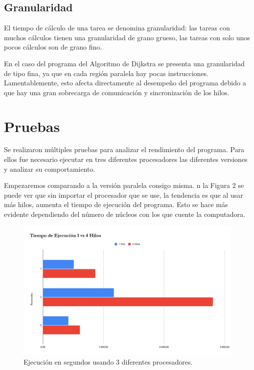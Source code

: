 \documentclass[11pt]{article}
\begin{document}
\subsection{Granularidad}
El tiempo de cálculo de una tarea se denomina granularidad: las tareas con muchos cálculos tienen una granularidad de grano grueso, las tareas con solo unos pocos cálculos son de grano fino. 
\par
En el caso del programa del Algoritmo de Dijkstra se presenta una granularidad de tipo fina, ya que en cada región paralela hay pocas instrucciones. Lamentablemente, esto afecta directamente al desempeño del programa debido a que hay una gran sobrecarga de comunicación y sincronización de los hilos.

\section{Pruebas}

\par
Se realizaron múltiples pruebas para analizar el rendimiento del programa. Para ellos fue necesario ejecutar en tres diferentes procesadores las diferentes versiones y analizar su comportamiento. 

\par
Empezaremos comparando a la versión paralela consigo misma. n la Figura 2 se puede ver que sin importar el procesador que se use, la tendencia es que al usar más hilos, aumenta el tiempo de ejecución del programa. Esto se hace más evidente dependiendo del número de núcleos con los que cuente la computadora.  

\begin{figure}[!h]
\centering
\includegraphics[width=1\linewidth]{hil1v4.png}
  \caption{Ejecución en segundos usando 3 diferentes procesadores.}
\end{figure}
\end{document}
